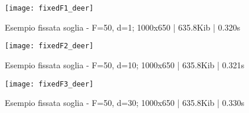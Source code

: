 \begin{figure}[H]
    \texttt{[image: fixedF1\_deer]}\centering
    \caption{Esempio fissata soglia - F=50, d=1; 1000x650 | 635.8Kib | 0.320s}\label{fig:fixedF1_deer}
\end{figure}
\begin{figure}[H]
    \texttt{[image: fixedF2\_deer]}\centering
    \caption{Esempio fissata soglia - F=50, d=10; 1000x650 | 635.8Kib | 0.321s}\label{fig:fixedF2_deer}
\end{figure}
\begin{figure}[H]
    \texttt{[image: fixedF3\_deer]}\centering
    \caption{Esempio fissata soglia - F=50, d=30; 1000x650 | 635.8Kib | 0.330s}\label{fig:fixedF3_deer}
\end{figure}
